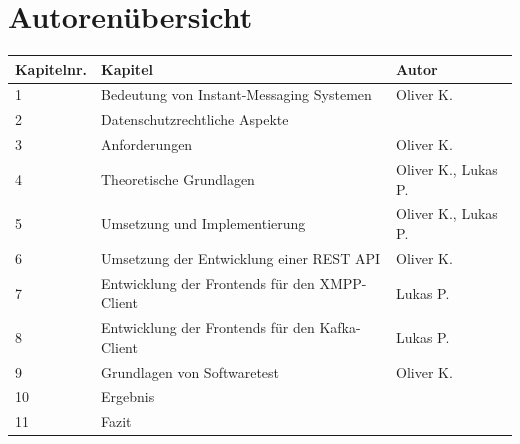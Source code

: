 \documentclass[a4paper,titlepage,halfparskip,12pt]{scrreprt}
\begin{document}
\renewcommand{\sectionmark}[1]{\markright{\thesection\ #1}} %



\newpage
{}

\chapter*{Autorenübersicht}
\renewcommand{\arraystretch}{1.5}
\begin{table}[h]
	\centering
	\begin{tabular*}{\linewidth}{lll@{\extracolsep{\fill}}}
		\textbf{Kapitelnr.} & \textbf{Kapitel} & \textbf{Autor} \\
		\hline
		1 & Bedeutung von Instant-Messaging Systemen & Oliver K. \\
		2 & Datenschutzrechtliche Aspekte & \\
		3 & Anforderungen & Oliver K. \\
		4 & Theoretische Grundlagen & Oliver K., Lukas P. \\
		5 & Umsetzung und Implementierung & Oliver K., Lukas P.\\
		6 & Umsetzung der Entwicklung einer REST API & Oliver K.\\
		7 & Entwicklung der Frontends für den XMPP-Client & Lukas P.\\
		8 & Entwicklung der Frontends für den Kafka-Client & Lukas P.\\
		9 & Grundlagen von Softwaretest & Oliver K.\\
		10 & Ergebnis & \\
		11 & Fazit & \\
	\end{tabular*}
	\label{tab:autorenuebersicht}
\end{table}
\end{document}
